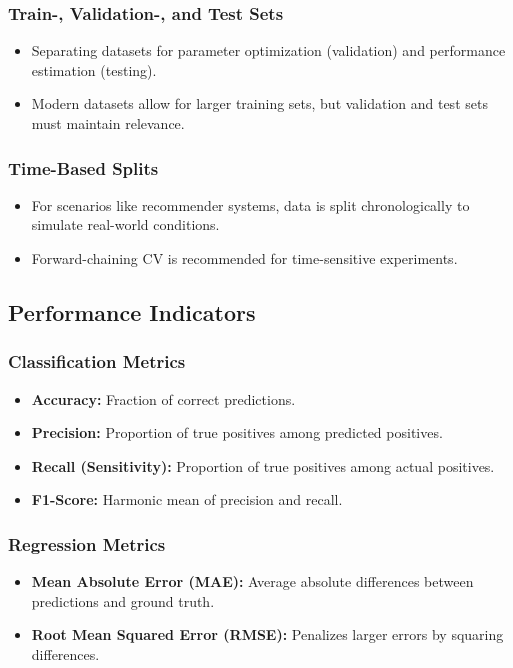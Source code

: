 \subsubsection{Train-, Validation-, and Test Sets}
\begin{itemize}
    \item Separating datasets for parameter optimization (validation) and performance estimation (testing).
    \item Modern datasets allow for larger training sets, but validation and test sets must maintain relevance.
\end{itemize}

\subsubsection{Time-Based Splits}
\begin{itemize}
    \item For scenarios like recommender systems, data is split chronologically to simulate real-world conditions.
    \item Forward-chaining CV is recommended for time-sensitive experiments.
\end{itemize}

\subsection{Performance Indicators}
\subsubsection{Classification Metrics}
\begin{itemize}
    \item \textbf{Accuracy:} Fraction of correct predictions.
    \item \textbf{Precision:} Proportion of true positives among predicted positives.
    \item \textbf{Recall (Sensitivity):} Proportion of true positives among actual positives.
    \item \textbf{F1-Score:} Harmonic mean of precision and recall.
\end{itemize}

\subsubsection{Regression Metrics}
\begin{itemize}
    \item \textbf{Mean Absolute Error (MAE):} Average absolute differences between predictions and ground truth.
    \item \textbf{Root Mean Squared Error (RMSE):} Penalizes larger errors by squaring differences.
\end{itemize}

